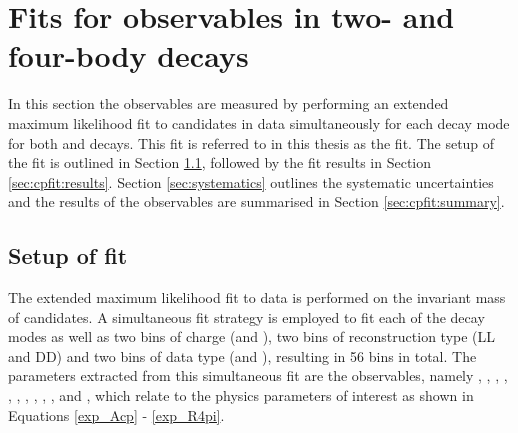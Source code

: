 \clearpage
%

\chapter{\label{ch:5-cpfit}Fits for \CP observables in two- and four-body decays} 


In this section the \CP observables are measured by performing an extended maximum likelihood fit to \btodkst candidates in data simultaneously for each \Dz decay mode for both \Bp and \Bm decays. This fit is referred to in this thesis as the \CP fit. The setup of the \CP fit is outlined in Section \ref{sec:cpfit:setup}, followed by the fit results in Section \ref{sec:cpfit:results}. Section \ref{sec:systematics} outlines the systematic uncertainties and the results of the \CP observables are summarised in Section \ref{sec:cpfit:summary}.

\section{Setup of \CP fit}
\label{sec:cpfit:setup}

The extended maximum likelihood fit to data is performed on the invariant mass of \btodkst candidates. A simultaneous fit strategy is employed to fit each of the \Dz decay modes as well as two bins of \B charge (\Bp and \Bm), two bins of \KS reconstruction type (LL and DD) and two bins of data type (\runone and \runtwo), resulting in 56 bins in total. The parameters extracted from this simultaneous fit are the \CP observables, namely \Akpi, \Akk, \Apipi, \Rkk, \Rpipi, \Rptwo, \Rmtwo, \Akpipipi, \Apipipipi, \Rpipipipi, \Rpfour and \Rmfour, which relate to the physics parameters of interest as shown in Equations \ref{exp_Acp} - \ref{exp_R4pi}.

